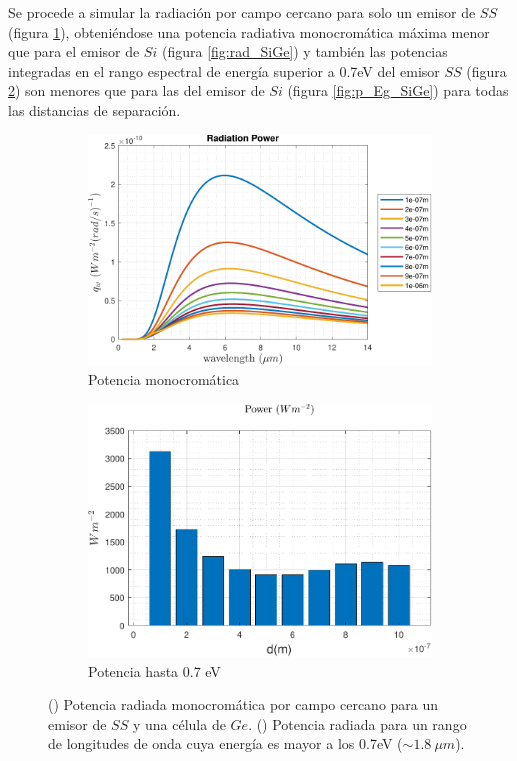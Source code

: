 Se procede a simular la radiación por campo cercano para solo un emisor de $SS$ (figura \ref{fig:SsGe}), obteniéndose una potencia radiativa monocromática máxima menor que para el emisor de $Si$ (figura \ref{fig:rad_SiGe}) y también las potencias integradas en el rango espectral de energía superior a 0.7eV del emisor $SS$ (figura \ref{fig:p_Eg_SsGe}) son menores que para las del emisor de $Si$ (figura \ref{fig:p_Eg_SiGe}) para todas las distancias de separación.
\begin{figure}[H]
	\centering
	\begin{subfigure}[b]{0.49\textwidth}
	\centering
		\includegraphics[width=1.00\textwidth]{figuras/Resultados/radiacion/SsGe.pdf}
	\caption{Potencia monocromática}
	\label{fig:SsGe}
\end{subfigure}
\begin{subfigure}[b]{0.49\textwidth}
	\centering
		\includegraphics[width=1.00\textwidth]{figuras/Resultados/radiacion/p_Eg_SsGe.pdf}
	\caption{Potencia hasta 0.7 eV}
	\label{fig:p_Eg_SsGe}
\end{subfigure}
\caption{() Potencia radiada monocromática por campo cercano para un emisor de $SS$ y una célula de $Ge$. () Potencia radiada para un rango de longitudes de onda cuya energía es mayor a los 0.7eV ($\sim 1.8 \ \mu m$).}
	\label{fig:rad_SsGe}
\end{figure}
